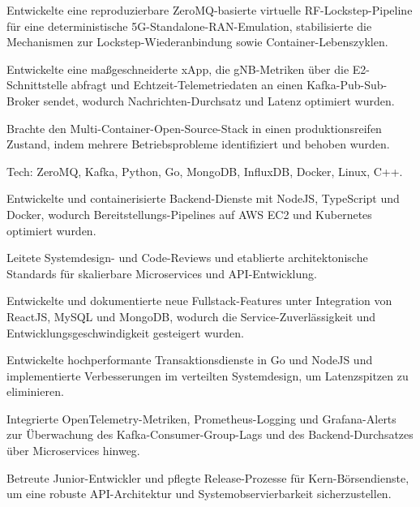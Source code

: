 \documentclass[10pt,a4paper]{resume}
\begin{document}
\bullets
  \item Entwickelte eine reproduzierbare ZeroMQ-basierte virtuelle RF-Lockstep-Pipeline für eine deterministische 5G-Standalone-RAN-Emulation, stabilisierte die Mechanismen zur Lockstep-Wiederanbindung sowie Container-Lebenszyklen.
  \item Entwickelte eine maßgeschneiderte xApp, die gNB-Metriken über die E2-Schnittstelle abfragt und Echtzeit-Telemetriedaten an einen Kafka-Pub-Sub-Broker sendet, wodurch Nachrichten-Durchsatz und Latenz optimiert wurden.
  \item Brachte den Multi-Container-Open-Source-Stack in einen produktionsreifen Zustand, indem mehrere Betriebsprobleme identifiziert und behoben wurden.
  \item Tech: ZeroMQ, Kafka, Python, Go, MongoDB, InfluxDB, Docker, Linux, C++.
\bulletsend
\vspace{1.5pt}
\bullets
  \item Entwickelte und containerisierte Backend-Dienste mit NodeJS, TypeScript und Docker, wodurch Bereitstellungs-Pipelines auf AWS EC2 und Kubernetes optimiert wurden.
  \item Leitete Systemdesign- und Code-Reviews und etablierte architektonische Standards für skalierbare Microservices und API-Entwicklung.
  \item Entwickelte und dokumentierte neue Fullstack-Features unter Integration von ReactJS, MySQL und MongoDB, wodurch die Service-Zuverlässigkeit und Entwicklungsgeschwindigkeit gesteigert wurden.
\bulletsend
\vspace{1.5pt}
\bullets
  \item Entwickelte hochperformante Transaktionsdienste in Go und NodeJS und implementierte Verbesserungen im verteilten Systemdesign, um Latenzspitzen zu eliminieren.
  \item Integrierte OpenTelemetry-Metriken, Prometheus-Logging und Grafana-Alerts zur Überwachung des Kafka-Consumer-Group-Lags und des Backend-Durchsatzes über Microservices hinweg.
  \item Betreute Junior-Entwickler und pflegte Release-Prozesse für Kern-Börsendienste, um eine robuste API-Architektur und Systemobservierbarkeit sicherzustellen.
\bulletsend
\vspace{1.5pt}
\end{document}
